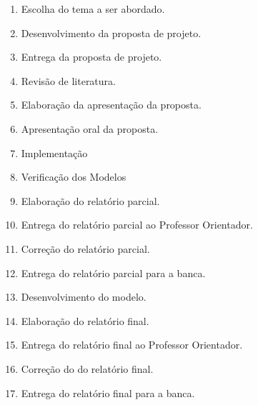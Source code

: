 \documentclass[
	12pt,				%
	openright,			%
	twoside,			%
	a4paper,			%
	english,			%
	brazil,				%
	]{abntex2}
\begin{document}
\begin{enumerate}
	\item \label{etapa1} Escolha do tema a ser abordado.
	\item \label{etapa2} Desenvolvimento da proposta de projeto.
	\item \label{etapa3} Entrega da proposta de projeto.
	\item \label{etapa4} Revisão de literatura.
	\item \label{etapa5} Elaboração da apresentação da proposta.
	\item \label{etapa6} Apresentação oral da proposta.
	\item \label{etapa7} Implementação
    \item \label{etapa8} Verificação dos Modelos
	\item \label{etapa9} Elaboração do relatório parcial.
	\item \label{etapa10} Entrega do relatório parcial ao Professor Orientador.
	\item \label{etapa11} Correção do relatório parcial.
	\item \label{etapa12} Entrega do relatório parcial para a banca.
	\item \label{etapa13} Desenvolvimento do modelo.
    \item \label{etapa14} Elaboração do relatório final.
	\item \label{etapa15} Entrega do relatório final ao Professor Orientador.
	\item \label{etapa16} Correção do do relatório final.
	\item \label{etapa17} Entrega do relatório final para a banca.
\end{enumerate}
\end{document}
